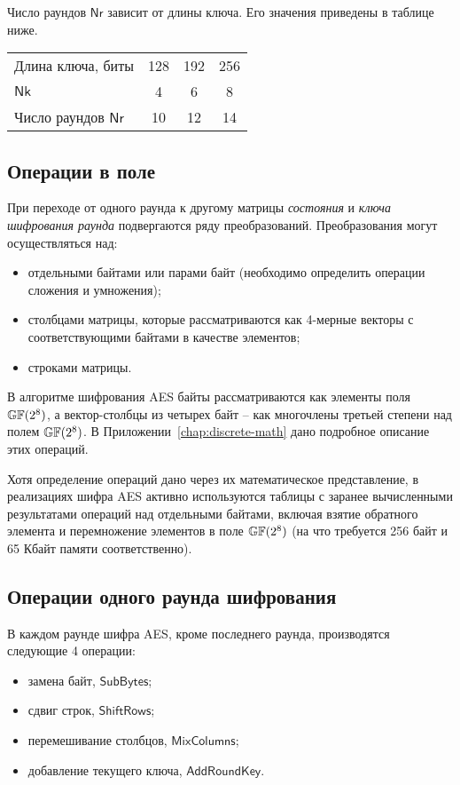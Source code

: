Число раундов $\mathsf{Nr}$ зависит от длины ключа. Его значения приведены в таблице ниже.

\begin{center}
    \begin{tabular}{|l|c|c|c|}
    \hline
    Длина ключа, биты           &128 & 192 & 256 \\
    $\mathsf{Nk}$               & 4  & 6   & 8 \\
    Число раундов $\mathsf{Nr}$ & 10 & 12 & 14 \\
    \hline
    \end{tabular}
\end{center}


\subsection{Операции в поле}

При переходе от одного раунда к другому матрицы \textit{состояния} и \textit{ключа шифрования раунда} подвергаются ряду преобразований. Преобразования могут осуществляться над:
\begin{itemize}
    \item отдельными байтами или парами байт (необходимо определить операции сложения и умножения);
    \item столбцами матрицы, которые рассматриваются как 4-мерные векторы с соответствующими байтами в качестве элементов;
    \item строками матрицы.
\end{itemize}

В алгоритме шифрования AES байты рассматриваются как элементы поля $\mathbb{GF}(2^8)$, а вектор-столбцы из четырех байт -- как многочлены третьей степени над полем $\mathbb{GF}(2^8)$. В Приложении~\ref{chap:discrete-math} дано подробное описание этих операций.

Хотя определение операций дано через их математическое представление, в реализациях шифра AES активно используются таблицы с заранее вычисленными результатами операций над отдельными байтами, включая взятие обратного элемента и перемножение элементов в поле $\mathbb{GF}(2^8)$ (на что требуется 256 байт и 65 Кбайт памяти соответственно).

\subsection{Операции одного раунда шифрования}

В каждом раунде шифра AES, кроме последнего раунда, производятся следующие 4 операции:
\begin{itemize}
  \item замена байт, $\mathsf{SubBytes}$;
  \item сдвиг строк, $\mathsf{ShiftRows}$;
  \item перемешивание столбцов, $\mathsf{MixColumns}$;
  \item добавление текущего ключа, $\mathsf{AddRoundKey}$.
\end{itemize}

